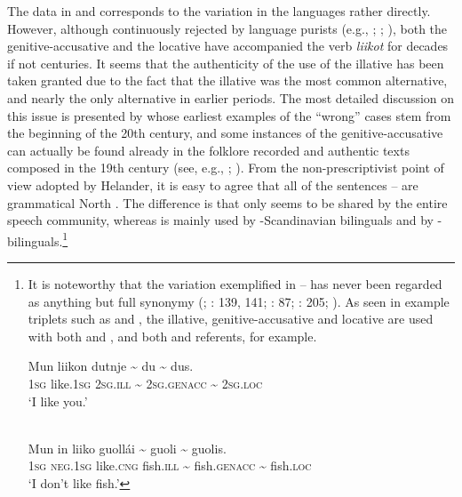 \documentclass[output=paper]{LSP/langsci}
\begin{document}
The data in  and  corresponds to the variation in the  languages rather directly. However, although continuously rejected by language purists (e.g., \citealt[127]{Magga1987Samas}; \citealt[87]{Callinravagirji2003}; \citealt[425]{Vuolab-Lohi2007Mailmmi}), both the genitive-accusative and the locative have accompanied the verb \textit{liikot} for decades if not centuries. It seems that the authenticity of the use of the illative has been taken granted due to the fact that the illative was the most common alternative, and nearly the only alternative in earlier periods. The most detailed discussion on this issue is presented by \citet[139]{Helander2001Ii} whose earliest examples of the “wrong” cases stem from the beginning of the 20th century, and some instances of the genitive-accusative can actually be found already in the folklore recorded and authentic texts composed in the 19th century (see, e.g., \citealt[134, 190]{Qvigstad1927Lappiske}; \citealt{Ylikoski2016}). From the non-prescriptivist point of view adopted by Helander, it is easy to agree that all of the sentences -- are grammatical North . The difference is that only  seems to be shared by the entire speech community, whereas  is mainly used by -Scandinavian bilinguals and  by - bilinguals.\footnote{It is noteworthy that the variation exemplified in -- has never been regarded as anything but full synonymy (\citealt[127]{Magga1987Samas}; \citealt{Helander2001Ii}: 139, 141; \citealt{Callinravagirji2003}: 87; \citealt{Sammallahti2005Laidehus}: 205; \citealt[425]{Vuolab-Lohi2007Mailmmi}). As seen in example triplets such as  and , the illative, genitive-accusative and locative are used with both  and , and both  and  referents, for example.

\ea{}

\label{16-ki-ex:i}
\gll Mun liikon dutnje {\textasciitilde} du {\textasciitilde} dus.\\
 \textsc{1sg} like.\textsc{1sg} \textsc{2sg}.\textsc{ill} {\textasciitilde} \textsc{2sg}.\textsc{genacc} {\textasciitilde} \textsc{2sg}.\textsc{loc}\\
\glt  ‘I like you.’ 
\z

\ea  
\label{16-ki-ex:ii}
\\
\gll Mun in liiko guollái {\textasciitilde} guoli {\textasciitilde} guolis.\\
 \textsc{1sg} \textsc{neg}.\textsc{1sg} like.\textsc{cng} fish.\textsc{ill} {\textasciitilde} fish.\textsc{genacc} {\textasciitilde} fish.\textsc{loc}\\
\glt ‘I don’t like fish.’ 
\z
}
\end{document}
